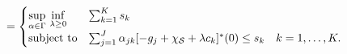 {\begin{equation*}
\begin{aligned}
&= \begin{cases}
	\underset{\alpha \in \Gamma}{\sup}~\underset{\lambda \geq 0}{\inf} &\sum_{k=1}^K s_k  \\
	\mbox{subject to}& \sum_{j=1}^J \alpha_{jk}[-g_j +\chi_{\mathcal{S}} + \lambda c_k]^*(0) \le s_k \quad k = 1,\dots,K.
\end{cases}\\
\end{aligned}
\end{equation*}
}
